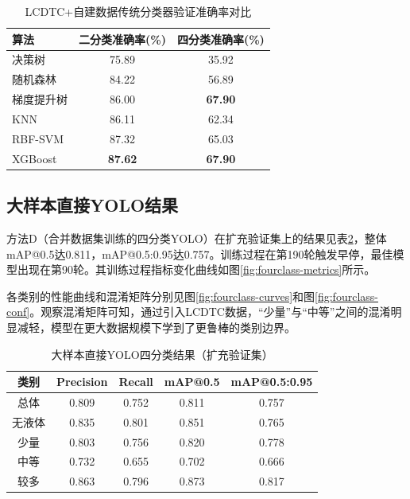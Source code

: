 \documentclass[withoutpreface,bwprint]{cumcmthesis}
\begin{document}
\begin{table}[htbp]
    \centering
    \caption{LCDTC+自建数据传统分类器验证准确率对比}
    \label{tab:classifier-compare}
    \small
    \begin{tabular}{lcc}
        \toprule
        算法 & 二分类准确率(\%) & 四分类准确率(\%) \\
        \midrule
        决策树 & 75.89 & 35.92 \\
        随机森林 & 84.22 & 56.89 \\
        梯度提升树 & 86.00 & \textbf{67.90} \\
        KNN & 86.11 & 62.34 \\
        RBF-SVM & 87.32 & 65.03 \\
        XGBoost & \textbf{87.62} & \textbf{67.90} \\
        \bottomrule
    \end{tabular}
\end{table}

\FloatBarrier

\subsection{大样本直接YOLO结果}
方法D（合并数据集训练的四分类YOLO）在扩充验证集上的结果见表\ref{tab:yolo-fourclass}，整体mAP@0.5达0.811，mAP@0.5:0.95达0.757。训练过程在第190轮触发早停，最佳模型出现在第90轮。其训练过程指标变化曲线如图\ref{fig:fourclass-metrics}所示。

各类别的性能曲线和混淆矩阵分别见图\ref{fig:fourclass-curves}和图\ref{fig:fourclass-conf}。观察混淆矩阵可知，通过引入LCDTC数据，“少量”与“中等”之间的混淆明显减轻，模型在更大数据规模下学到了更鲁棒的类别边界。

\begin{table}[htbp]
    \centering
    \caption{大样本直接YOLO四分类结果（扩充验证集）}
    \label{tab:yolo-fourclass}
    \small
    \begin{tabular}{ccccc}
        \toprule
        类别 & Precision & Recall & mAP@0.5 & mAP@0.5:0.95 \\
        \midrule
        总体   & 0.809 & 0.752 & 0.811 & 0.757 \\
        无液体 & 0.835 & 0.801 & 0.851 & 0.765 \\
        少量   & 0.803 & 0.756 & 0.820 & 0.778 \\
        中等   & 0.732 & 0.655 & 0.702 & 0.666 \\
        较多   & 0.863 & 0.796 & 0.873 & 0.817 \\
        \bottomrule
    \end{tabular}
\end{table}
\end{document}
